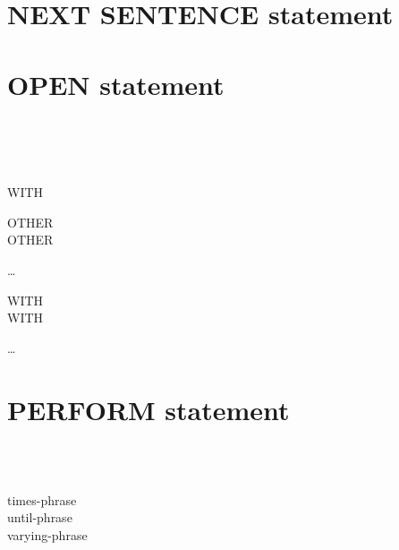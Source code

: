\section{NEXT SENTENCE statement}


\section{OPEN statement}

\begin{1=}
  \begin{1=}
     \\
     \\
     \\
  \end{1=}
  \begin{0-1}
     WITH
    \begin{1=}
       OTHER \\
       OTHER \\
       
    \end{1=}
  \end{0-1}
  \begin{1=}
    \filename
  \end{1=} \ldots
  \begin{0-1}
    WITH   \\
    WITH  \\
  \end{0-1}
\end{1=}\ldots


\section{PERFORM statement}

 \procedurename
\begin{0-1}
  \begin{1=}
     \\
  \end{1=}
  \procedurename
\end{0-1}
\begin{0-1}
   \\
  times-phrase \\
  until-phrase \\
  varying-phrase
\end{0-1}

